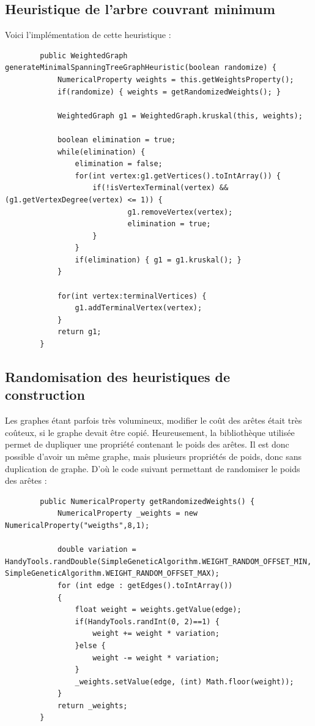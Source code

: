 	\subsection{Heuristique de l'arbre couvrant minimum}

		Voici l'implémentation de cette heuristique :

		\begin{lstlisting}
		public WeightedGraph generateMinimalSpanningTreeGraphHeuristic(boolean randomize) {
			NumericalProperty weights = this.getWeightsProperty();
			if(randomize) { weights = getRandomizedWeights(); }

			WeightedGraph g1 = WeightedGraph.kruskal(this, weights);

			boolean elimination = true;
			while(elimination) {
				elimination = false;
				for(int vertex:g1.getVertices().toIntArray()) {
					if(!isVertexTerminal(vertex) && (g1.getVertexDegree(vertex) <= 1)) {
							g1.removeVertex(vertex);
							elimination = true;
					}
				}
				if(elimination) { g1 = g1.kruskal(); }	
			}

			for(int vertex:terminalVertices) {
				g1.addTerminalVertex(vertex);
			}
			return g1;
		}
		\end{lstlisting}

	\subsection{Randomisation des heuristiques de construction}

	Les graphes étant parfois très volumineux, modifier le coût des arêtes était très coûteux, si le graphe devait être copié. Heureusement,
la bibliothèque utilisée permet de dupliquer une propriété contenant le poids des arêtes. Il est donc possible d'avoir un même graphe, mais
plusieurs propriétés de poids, donc sans duplication de graphe. D'où le code suivant permettant de randomiser le poids des arêtes :
		\begin{lstlisting}
		public NumericalProperty getRandomizedWeights() {
			NumericalProperty _weights = new NumericalProperty("weigths",8,1);	

			double variation = HandyTools.randDouble(SimpleGeneticAlgorithm.WEIGHT_RANDOM_OFFSET_MIN, SimpleGeneticAlgorithm.WEIGHT_RANDOM_OFFSET_MAX);
			for (int edge : getEdges().toIntArray())
			{
				float weight = weights.getValue(edge);
				if(HandyTools.randInt(0, 2)==1) {
					weight += weight * variation;
				}else {
					weight -= weight * variation;
				}
				_weights.setValue(edge, (int) Math.floor(weight));
			}
			return _weights;
		}
		\end{lstlisting}

